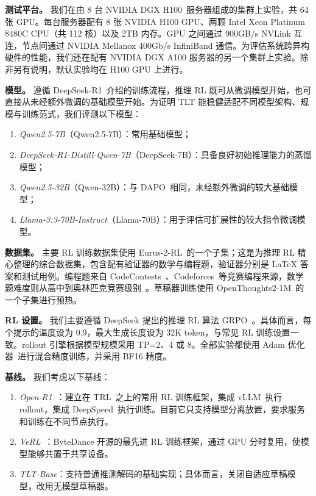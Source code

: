 \documentclass[10pt,twocolumn]{article}
\newcommand{\SysName}{\textrm{TLT}\xspace}
\begin{document}
\noindent\textbf{测试平台。}
我们在由 8 台 NVIDIA DGX H100~\cite{dgx-h100}服务器组成的集群上实验，共 64 张 GPU。每台服务器配有 8 张 NVIDIA H100 GPU、两颗 Intel Xeon Platinum 8480C CPU（共 112 核）以及 2TB 内存。GPU 之间通过 900GB/s NVLink 互连，节点间通过 NVIDIA Mellanox 400Gb/s InfiniBand 通信。为评估系统跨异构硬件的性能，我们还在配有 NVIDIA DGX A100 服务器的另一个集群上实验。除非另有说明，默认实验均在 H100 GPU 上进行。

\noindent\textbf{模型。}
遵循 DeepSeek-R1~\cite{DeepSeekR1}介绍的训练流程，推理 RL 既可从微调模型开始，也可直接从未经额外微调的基础模型开始。为证明 \SysName 能稳健适配不同模型架构、规模与训练范式，我们评测以下模型：
\begin{enumerate}[label=(\arabic*),topsep=2pt,itemsep=1pt,leftmargin=20pt]
  \item \emph{Qwen2.5-7B}（Qwen2.5-7B）：常用基础模型；
  \item \emph{DeepSeek-R1-Distill-Qwen-7B}（DeepSeek-7B）：具备良好初始推理能力的蒸馏模型；
  \item \emph{Qwen2.5-32B}（Qwen-32B）：与 DAPO~\cite{DAPO}相同，未经额外微调的较大基础模型；
  \item \emph{Llama-3.3-70B-Instruct}（Llama-70B）：用于评估可扩展性的较大指令微调模型。
\end{enumerate}

\noindent\textbf{数据集。}
主要 RL 训练数据集使用 Eurus-2-RL~\cite{Prime}的一个子集；这是为推理 RL 精心整理的综合数据集，包含配有验证器的数学与编程题，验证器分别是 LaTeX 答案和测试用例。编程题来自 CodeContests~\cite{CodeContests}、Codeforces~\cite{codeforces}等竞赛编程来源，数学题难度则从高中到奥林匹克竞赛级别~\cite{numina_math}。草稿器训练使用 OpenThoughts2-1M~\cite{OpenThoughts2-1M}的一个子集进行预热。

\noindent\textbf{RL 设置。}
我们主要遵循 DeepSeek 提出的推理 RL 算法 GRPO~\cite{DeepSeekR1,DeepSeekMath}。具体而言，每个提示的温度设为 0.9，最大生成长度设为 32K token，与常见 RL 训练设置一致。rollout 引擎根据模型规模采用 TP=2、4 或 8。全部实验都使用 Adam 优化器~\cite{Adam}进行混合精度训练，并采用 BF16 精度。

\noindent\textbf{基线。}
我们考虑以下基线：
\begin{enumerate}[label=(\arabic*),topsep=2pt,itemsep=1pt,leftmargin=20pt]
  \item \emph{Open-R1}~\cite{openr1}：建立在 TRL~\cite{TRL}之上的常用 RL 训练框架，集成 vLLM~\cite{vLLM}执行 rollout，集成 DeepSpeed~\cite{ZeRO}执行训练。目前它只支持模型分离放置，要求服务和训练在不同节点执行。
  \item \emph{VeRL}~\cite{HybridFlow}：ByteDance 开源的最先进 RL 训练框架，通过 GPU 分时复用，使模型能够共置于共享设备。
  \item \emph{\SysName-Base}：支持普通推测解码的基础实现；具体而言，关闭自适应草稿模型，改用无模型草稿器。
\end{enumerate}
\end{document}
